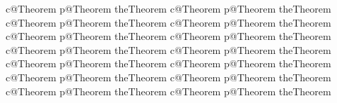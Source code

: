 
\newif\ifnever\neverfalse


\newcommand*{\CopyCounter}[2]{%
  \expandafter\def\csname c@#2\endcsname{\csname c@#1\endcsname}%
  \expandafter\def\csname p@#2\endcsname{\csname p@#1\endcsname}%
  \expandafter\def\csname the#2\endcsname{\csname the#1\endcsname}}
\CopyCounter{Theorem}{Proposition}
\CopyCounter{Theorem}{ProposedProblem}
\CopyCounter{Theorem}{Property}
\CopyCounter{Theorem}{Claim}
\CopyCounter{Theorem}{Lemma}
\CopyCounter{Theorem}{Corollary}
\CopyCounter{Theorem}{Conjecture}
\CopyCounter{Theorem}{Definition}
\CopyCounter{Theorem}{Example}
\CopyCounter{Theorem}{Remark}
\CopyCounter{Theorem}{Question}
\CopyCounter{Theorem}{Condition}
\CopyCounter{Theorem}{Criterion}
\CopyCounter{Theorem}{Observation}
\theoremstyle{plain}%
\newtheorem{thm}[Theorem]{Theorem}
\providecommand\Theoremname{Theorem}
\newtheorem{problem}[ProposedProblem]{Problem} %
\providecommand\ProposedProblemname{ProposedProblem}
\newtheorem{prop}[Proposition]{Proposition}
\providecommand\Propositionname{Proposition}
\newtheorem{property}[Property]{Property}
\providecommand\Propertyname{Property}
\newtheorem{claim}[Claim]{Claim}
\providecommand\Claimname{Claim}
\newtheorem{lemma}[Lemma]{Lemma}
\providecommand\Lemmaname{Lemma}
\newtheorem{cor}[Corollary]{Corollary}
\providecommand\Corollaryname{Corollary}
\theoremstyle{definition}%
\newtheorem{definition}[Definition]{Definition}
\newtheorem{example}[Example]{Example}
\newtheorem{remark}[Remark]{Remark}
\providecommand\Remarkname{Remark}
\newtheorem{conjecture}[Conjecture]{Conjecture}
\providecommand\Conjecturename{Conjecture}
\newtheorem{quest}[Question]{Question}
\newtheorem{cond}[Condition]{Condition}
\newtheorem{crit}[Criterion]{Criterion}
\newtheorem{observ}[Observation]{Observation}

